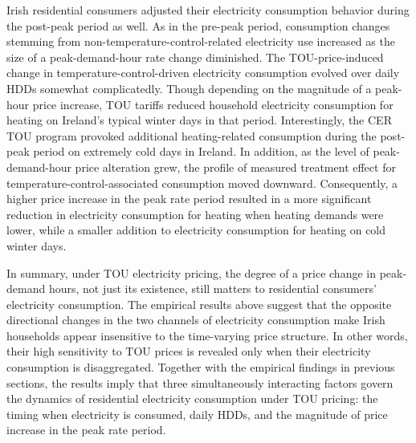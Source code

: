 Irish residential consumers adjusted their electricity consumption behavior during the post-peak period as well. As in the pre-peak period, consumption changes stemming from non-temperature-control-related electricity use increased as the size of a peak-demand-hour rate change diminished. The TOU-price-induced change in temperature-control-driven electricity consumption evolved over daily HDDs somewhat complicatedly. Though depending on the magnitude of a peak-hour price increase, TOU tariffs reduced household electricity consumption for heating on Ireland's typical winter days in that period. Interestingly, the CER TOU program provoked additional heating-related consumption during the post-peak period on extremely cold days in Ireland. In addition, as the level of peak-demand-hour price alteration grew, the profile of measured treatment effect for temperature-control-associated consumption moved downward. Consequently, a higher price increase in the peak rate period resulted in a more significant reduction in electricity consumption for heating when heating demands were lower, while a smaller addition to electricity consumption for heating on cold winter days. 

In summary, under TOU electricity pricing, the degree of a price change in peak-demand hours, not just its existence, still matters to residential consumers' electricity consumption. The empirical results above suggest that the opposite directional changes in the two channels of electricity consumption make Irish households appear insensitive to the time-varying price structure. In other words, their high sensitivity to TOU prices is revealed only when their electricity consumption is disaggregated. Together with the empirical findings in previous sections, the results imply that three simultaneously interacting factors govern the dynamics of residential electricity consumption under TOU pricing: the timing when electricity is consumed, daily HDDs, and the magnitude of price increase in the peak rate period.  
